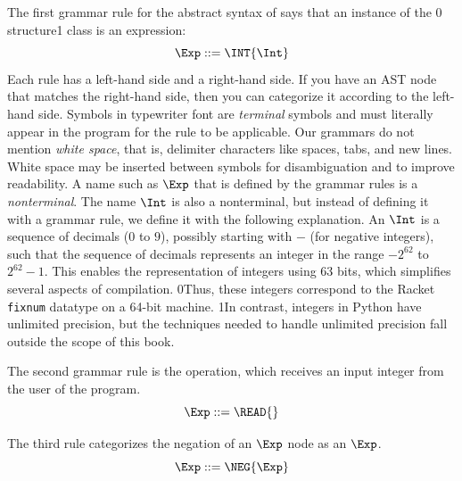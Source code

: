 \documentclass[7x10]{TimesAPriori_MIT}%
\def\racketEd{0}
\def\pythonEd{1}
\def\edition{0}
\newcommand{\racket}[1]{{\if\edition\racketEd{#1}\fi}}
\newcommand{\python}[1]{{\if\edition\pythonEd #1\fi}}
\numberwithin{theorem}{chapter}
\numberwithin{definition}{chapter}
\numberwithin{equation}{chapter}
\begin{document}
The first grammar rule for the abstract syntax of \LangInt{} says that an
instance of the \racket{ structure}\python{ class} is an expression:
\begin{equation}
\Exp ::= \INT{\Int}  \label{eq:arith-int}
\end{equation}
%
Each rule has a left-hand side and a right-hand side.
If you have an AST node that matches the
right-hand side, then you can categorize it according to the
left-hand side.
%
Symbols in typewriter font are \emph{terminal} symbols and must
literally appear in the program for the rule to be applicable.
%
Our grammars do not mention \emph{white space}, that is, delimiter
characters like spaces, tabs, and new lines. White space may be
inserted between symbols for disambiguation and to improve
readability.  
%
A name such as $\Exp$ that is defined by the grammar rules is a
\emph{nonterminal}.  
%
The name $\Int$ is also a nonterminal, but instead of defining it with
a grammar rule, we define it with the following explanation.  An
$\Int$ is a sequence of decimals ($0$ to $9$), possibly starting with
$-$ (for negative integers), such that the sequence of decimals
represents an integer in the range $-2^{62}$ to $2^{62}-1$.  This
enables the representation of integers using 63 bits, which simplifies
several aspects of compilation.
%
\racket{Thus, these integers correspond to the Racket \texttt{fixnum}
  datatype on a 64-bit machine.}
%
\python{In contrast, integers in Python have unlimited precision, but
  the techniques needed to handle unlimited precision fall outside the
  scope of this book.}

The second grammar rule is the \READOP{} operation, which receives an
input integer from the user of the program.
\begin{equation}
  \Exp ::= \READ{} \label{eq:arith-read}
\end{equation}

The third rule categorizes the negation of an $\Exp$ node as an
$\Exp$.
\begin{equation}
  \Exp ::= \NEG{\Exp}  \label{eq:arith-neg}
\end{equation}
\end{document}
